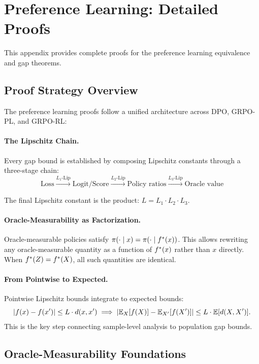 \section{Preference Learning: Detailed Proofs}
\label{app:preference-proofs}

This appendix provides complete proofs for the preference learning equivalence and gap theorems.

\subsection{Proof Strategy Overview}

The preference learning proofs follow a unified architecture across DPO, GRPO-PL, and GRPO-RL:

\paragraph{The Lipschitz Chain.}
Every gap bound is established by composing Lipschitz constants through a three-stage chain:
\[
\text{Loss} \xrightarrow{L_1\text{-Lip}} \text{Logit/Score} \xrightarrow{L_2\text{-Lip}} \text{Policy ratios} \xrightarrow{L_3\text{-Lip}} \text{Oracle value}
\]

The final Lipschitz constant is the product: $L = L_1 \cdot L_2 \cdot L_3$.

\paragraph{Oracle-Measurability as Factorization.}
Oracle-measurable policies satisfy $\pi(\cdot \mid x) = \pi(\cdot \mid f^{\ast}(x))$. This allows rewriting any oracle-measurable quantity as a function of $f^{\ast}(x)$ rather than $x$ directly. When $f^{\ast}(Z) = f^{\ast}(X)$, all such quantities are identical.

\paragraph{From Pointwise to Expected.}
Pointwise Lipschitz bounds integrate to expected bounds:
\[
|f(x) - f(x')| \le L \cdot d(x, x') \implies |\mathbb{E}_X[f(X)] - \mathbb{E}_{X'}[f(X')]| \le L \cdot \mathbb{E}[d(X, X')].
\]
This is the key step connecting sample-level analysis to population gap bounds.

\subsection{Oracle-Measurability Foundations}

